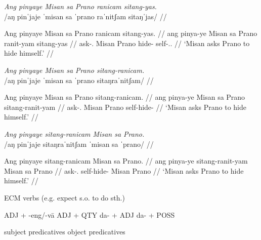 \documentclass[12pt,a4paper]{scrartcl}
\newcommand{\TsgM}{{\Tsg}.{\M}}
\newcommand{\TsgF}{{\Tsg}.{\F}}
\begin{document}
\ex\begingl
\glpreamble \textit{Ang pinyaye Misan sa Prano ranicam sitang-yas.} \\
	/aŋ pinˈjaje ˈmisan sa ˈprano raˈnitʃam sitaŋˈjas/ //

\gla Ang pinyaye Misan sa Prano ranicam sitang-yas. //
\glb ang pinya-ye Misan sa Prano ranit-yam sitang-yas //
\glc \AgtT{} ask-\TsgF{} Misan \Parg{} Prano hide-\Ptcp{} self-\TsgM{}.\Parg{} //
\glft `Misan asks Prano to hide himself.' //
\endgl\xe

\ex\begingl
\glpreamble \textit{Ang pinyaye Misan sa Prano sitang-ranicam.} \\
	/aŋ pinˈjaje ˈmisan sa ˈprano sitaŋraˈnitʃam/ //

\gla Ang pinyaye Misan sa Prano sitang-ranicam. //
\glb ang pinya-ye Misan sa Prano sitang-ranit-yam //
\glc \AgtT{} ask-\TsgF{} Misan \Parg{} Prano self-hide-\Ptcp{} //
\glft `Misan asks Prano to hide himself.' //
\endgl\xe

\ex\begingl
\glpreamble \textit{Ang pinyaye sitang-ranicam Misan sa Prano.} \\
	/aŋ pinˈjaje sitaŋraˈnitʃam ˈmisan sa ˈprano/ //

\gla Ang pinyaye sitang-ranicam Misan sa Prano. //
\glb ang pinya-ye sitang-ranit-yam Misan sa Prano //
\glc \AgtT{} ask-\TsgF{} self-hide-\Ptcp{} Misan \Parg{} Prano //
\glft `Misan asks Prano to hide himself.' //
\endgl\xe

\ex ECM verbs (e.g. expect s.o. to do sth.) \xe

\ex ADJ + -eng/-vā \xe
\ex ADJ + QTY \xe
\ex da- + ADJ \xe
\ex da- + POSS \xe

\ex subject predicatives \xe
\ex object predicatives \xe

\vfill

\begin{multicols}{2}
\printglossary[style=mysuper,type=\leipzigtype]
\end{multicols}
\end{document}

